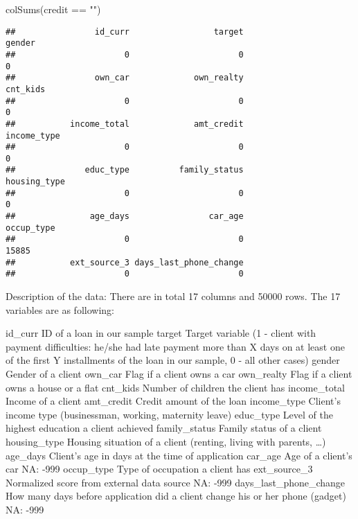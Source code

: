 \documentclass[
]{article}
\newenvironment{Shaded}{\begin{snugshade}}{\end{snugshade}}
\newcommand{\FunctionTok}[1]{\textcolor[rgb]{0.00,0.00,0.00}{#1}}
\newcommand{\NormalTok}[1]{#1}
\newcommand{\SpecialCharTok}[1]{\textcolor[rgb]{0.00,0.00,0.00}{#1}}
\newcommand{\StringTok}[1]{\textcolor[rgb]{0.31,0.60,0.02}{#1}}
\begin{document}
\begin{Shaded}
\begin{Highlighting}[]
\FunctionTok{colSums}\NormalTok{(credit }\SpecialCharTok{==} \StringTok{""}\NormalTok{)}
\end{Highlighting}
\end{Shaded}

\begin{verbatim}
##                id_curr                 target                 gender 
##                      0                      0                      0 
##                own_car             own_realty               cnt_kids 
##                      0                      0                      0 
##           income_total             amt_credit            income_type 
##                      0                      0                      0 
##              educ_type          family_status           housing_type 
##                      0                      0                      0 
##               age_days                car_age             occup_type 
##                      0                      0                  15885 
##           ext_source_3 days_last_phone_change 
##                      0                      0
\end{verbatim}

Description of the data: There are in total 17 columns and 50000 rows.
The 17 variables are as following:

id\_curr \textbar{} ID of a loan in our sample \textbar{} target
\textbar{} Target variable (1 - client with payment difficulties: he/she
had late payment more than X days on at least one of the first Y
installments of the loan in our sample, 0 - all other cases) \textbar{}
gender \textbar{} Gender of a client \textbar{} own\_car \textbar{} Flag
if a client owns a car \textbar{} own\_realty \textbar{} Flag if a
client owns a house or a flat \textbar{} cnt\_kids \textbar{} Number of
children the client has \textbar{} income\_total \textbar{} Income of a
client \textbar{} amt\_credit \textbar{} Credit amount of the loan
\textbar{} income\_type \textbar{} Client's income type (businessman,
working, maternity leave) \textbar{} educ\_type \textbar{} Level of the
highest education a client achieved \textbar{} family\_status\textbar{}
Family status of a client \textbar{} housing\_type \textbar{} Housing
situation of a client (renting, living with parents, \ldots) \textbar{}
age\_days \textbar{} Client's age in days at the time of application
\textbar{} car\_age \textbar{} Age of a client's car \textbar{} NA: -999
occup\_type \textbar{} Type of occupation a client has \textbar{}
ext\_source\_3 \textbar{} Normalized score from external data source
\textbar{} NA: -999 days\_last\_phone\_change \textbar{} How many days
before application did a client change his or her phone (gadget)
\textbar{} NA: -999
\end{document}
